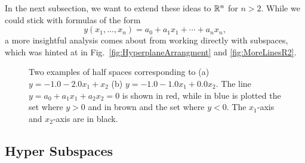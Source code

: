 \vspace*{.2cm}

In the next subsection, we want to extend these ideas to $\mathbb R^n$ for $n >2$. While we could stick with formulas of the form 
\begin{equation}
\label{eq:SimpleFormulaPlane}
    y(x_1, \ldots, x_n) = a_0 + a_1 x_1 + \cdots + a_n x_n,
\end{equation} 
a more insightful analysis comes about from working directly with subspaces, which was hinted at in Fig.~\ref{fig:HyperplaneArrangment} and \ref{fig:MoreLinesR2}. 


\vspace*{.2cm}
\begin{figure}[bht!]
    \centering
    \caption[]{Two examples of half spaces corresponding to (a) $y=-1.0 -2.0 x_1 + x_2$ (b) $y=-1.0 -1.0 x_1 + 0.0 x_2$.  The line $y=a_0 + a_1 x_1 + a_2 x_2=0$ is shown in red, while in blue is plotted the set where $y > 0$ and in brown and the set where $y < 0$. The $x_1$-axis and $x_2$-axis are in black. 
    }
    \label{fig:HalfSpacesR2}
    \end{figure}


\subsection{Hyper Subspaces}


